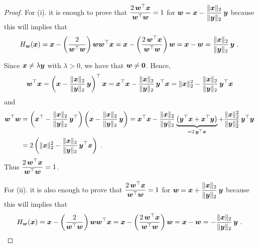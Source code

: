 \begin{proof}
 For (i). it is enough to prove that
$\displaystyle \frac{2\,\bm{w}^\top \bm{x}}{\bm{w}^\top\bm{w}} = 1$
for
$\displaystyle \bm{w} = \bm{x} - \frac{\|\bm{x}\|_2}{\|\bm{y}\|_2}
\, \bm{y}$ because this will implies that
\[
H_{\VEC{w}}(\VEC{x}) = \VEC{x} -\left(\frac{2}{\VEC{w}^\top\VEC{w}}\right)
\VEC{w}\VEC{w}^\top \VEC{x}
= \VEC{x} - \left(\frac{2\,\VEC{w}^\top \VEC{x}}{\VEC{w}^\top\VEC{w}}\right)
\VEC{w}
= \VEC{x} - \VEC{w} = \frac{\|\VEC{x}\|_2}{\|\VEC{y}\|_2}\, \VEC{y} \ .
\]

Since $\bm{x} \neq \lambda \bm{y}$ with $\lambda > 0$, we have that
$\bm{w} \neq \bm{0}$.   Hence,
\[
\bm{w}^\top\bm{x} =
\left( \bm{x} - \frac{\|\bm{x}\|_2}{\|\bm{y}\|_2} \, \bm{y} \right)^\top
\bm{x}
= \bm{x}^\top \bm{x}
- \frac{\|\bm{x}\|_2}{\|\bm{y}\|_2} \, \bm{y}^\top \bm{x}
= \|\bm{x}\|_2^2- \frac{\|\bm{x}\|_2}{\|\bm{y}\|_2} \, \bm{y}^\top \bm{x}
\]
and
\begin{align*}
\bm{w}^\top\bm{w} &= 
\left(\bm{x}^\top - \frac{\|\bm{x}\|_2}{\|\bm{y}\|_2}\, \bm{y}^\top \right)
\left(\bm{x} - \frac{\|\bm{x}\|_2}{\|\bm{y}\|_2} \, \bm{y} \right)
= \bm{x}^\top \bm{x} - \frac{\|\bm{x}\|_2}{\|\bm{y}\|_2}
\underbrace{\left( \bm{y}^\top\bm{x} + \bm{x}^\top\bm{y} \right)
}_{= 2\, \bm{y}^\top\bm{x}}
+ \frac{\|\bm{x}\|_2^2}{\|\bm{y}\|_2^2} \, \bm{y}^\top \bm{y} \\
&= 2 \left( \|\bm{x}\|_2^2 -
\frac{\|\bm{x}\|_2}{\|\bm{y}\|_2}\, \bm{y}^\top\bm{x}\right) \ .
\end{align*}
Thus $\displaystyle \frac{2\,\bm{w}^\top \bm{x}}{\bm{w}^\top\bm{w}} = 1$.

For (ii). it is also enough to prove that
$\displaystyle \frac{2\,\bm{w}^\top \bm{x}}{\bm{w}^\top\bm{w}} = 1$
for
$\displaystyle \bm{w} = \bm{x} + \frac{\|\bm{x}\|_2}{\|\bm{y}\|_2}
\, \bm{y}$ because this will implies that
\[
H_{\VEC{w}}(\VEC{x}) = \VEC{x} -\left(\frac{2}{\VEC{w}^\top\VEC{w}}\right)
\VEC{w}\VEC{w}^\top \VEC{x}
= \VEC{x} - \left(\frac{2\,\VEC{w}^\top \VEC{x}}{\VEC{w}^\top\VEC{w}}\right)
\VEC{w}
= \VEC{x} - \VEC{w} = - \frac{\|\VEC{x}\|_2}{\|\VEC{y}\|_2}\, \VEC{y} \ .
\]


\end{proof}
